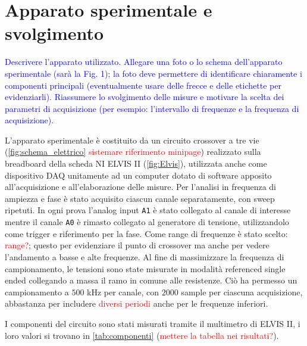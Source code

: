 \documentclass[12pt,italian]{article}
\newcommand{\prof}[1]{\textcolor{blue}{#1}}
\newcommand{\err}[1]{\textcolor{red}{#1}}
\begin{document}
\section*{Apparato sperimentale e svolgimento}
\prof{ Descrivere l'apparato utilizzato. Allegare una foto o lo schema
	dell'apparato sperimentale (sarà la Fig. 1); la foto deve permettere di
	identificare chiaramente i componenti principali (eventualmente usare delle
	frecce e delle etichette per evidenziarli). Riassumere lo svolgimento delle
	misure e motivare la scelta dei parametri di acquisizione (per esempio:
	l'intervallo di frequenze e la frequenza di acquisizione). }

L'apparato sperimentale è costituito da un circuito crossover a tre vie
(\cref{fig:schema_elettrico} \err{sistemare riferimento minipage}) realizzato
sulla breadboard della scheda NI ELVIS II (\cref{fig:Elvis}), utilizzata anche
come dispositivo DAQ unitamente ad un computer dotato di software apposito
all'acquisizione e all'elaborazione delle misure. Per l'analisi in frequenza di
ampiezza e fase è stato acquisito ciascun canale separatamente, con sweep
ripetuti. In ogni prova l'analog input \texttt{A1} è stato collegato al canale
di interesse mentre il canale \texttt{A0} è rimasto collegato al generatore di
tensione, utilizzandolo come trigger e riferimento per la fase. Come range di
frequenze è stato scelto: \err{range?}; questo per evidenziare il punto di
crossover ma anche per vedere l'andamento a basse e alte frequenze. Al fine di
massimizzare la frequenza di campionamento, le tensioni sono state misurate in
modalità referenced single ended collegando a massa il ramo in comune alle
resistenze. Ciò ha permesso un campionamento a $500$ kHz per canale, con $2000$
sample per ciascuna acquisizione, abbastanza per includere \err{diversi
	periodi} anche per le frequenze inferiori.

I componenti del circuito sono stati misurati tramite il multimetro di ELVIS
II, i loro valori si trovano in \cref{tab:componenti} (\err{mettere la tabella
	nei risultati?}).
\end{document}
